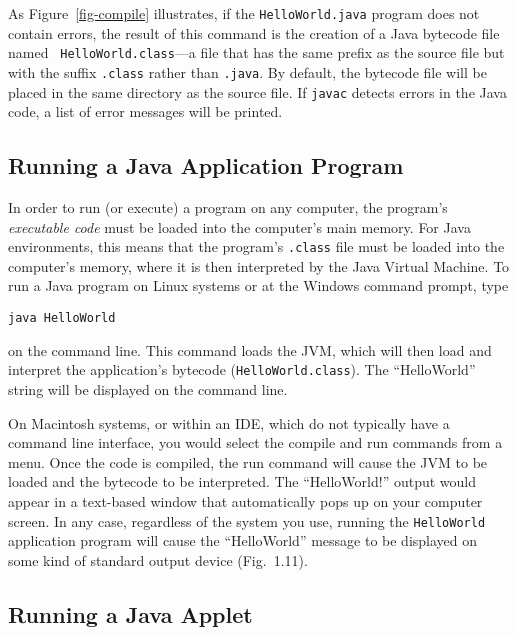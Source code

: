 \noindent As Figure~\ref{fig-compile} illustrates, if the 
{\tt HelloWorld.java} program does not contain errors, the result of
this command is the creation of a Java bytecode file named {\tt
HelloWorld.class}---a file that has the same prefix as the source file
but with the suffix {\tt .class} rather than {\tt .java}.  By default,
the bytecode file will be placed in the same directory as the source
file. If {\tt javac} detects errors in the Java code, a list of error
messages will be printed.

\subsection{Running a Java Application Program}

\noindent In order to run (or execute) a program on any computer, 
the program's {\it executable code} must be loaded into the
computer's main memory.  For Java environments, this means that the
program's {\tt .class} file must be loaded into the computer's memory,
where it is then interpreted by the Java Virtual Machine.  To run a
Java program on Linux systems or at the Windows command prompt, type

\begin{jjjlisting}
\begin{lstlisting}
java HelloWorld
\end{lstlisting}
\end{jjjlisting}

\noindent on the command line.  This command loads the JVM,
which will then load and interpret the application's bytecode
({\tt HelloWorld.class}). The ``HelloWorld'' string will be displayed on
the command line.

On Macintosh systems, or within an IDE, which do not typically 
have a command line interface, you would select the compile and run
commands from a menu.  Once the code is compiled, the run command will
cause the JVM to be loaded and the bytecode to be interpreted.  The
``HelloWorld!''  output would appear in a text-based window that
automatically pops up on your computer screen.  In any case,
regardless of the system you use, running the {\tt HelloWorld}
application program will cause the ``HelloWorld'' message to be
displayed on some kind of standard output device (Fig.~1.11).

\subsection{Running a Java Applet}
\label{sec-applet}

